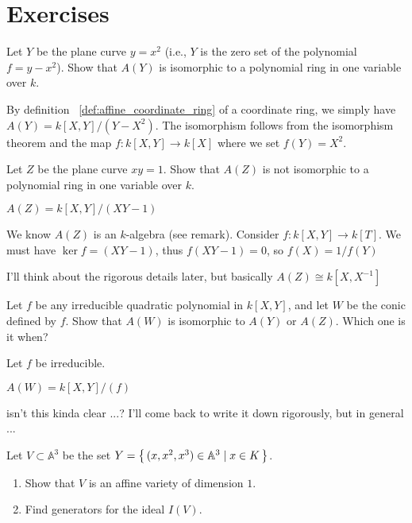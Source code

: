 \newpage
\section{Exercises}
%
%
\begin{exercise}[1.1. (a)]
    Let \( Y \) be the plane curve \( y = x^2 \) (i.e., \( Y \) is the zero set of the polynomial \( f = y - x^2 \)). Show that \( A(Y) \) is isomorphic to a polynomial ring in one variable over \( k \).
\end{exercise}
\begin{solution}
    By definition ~\ref{def:affine_coordinate_ring} of a coordinate ring, we simply have \(A(Y) = k[X, Y] / (Y - X^2)\). The isomorphism follows from the isomorphism theorem and the map \(f: k[X, Y] \rightarrow k[X]\) where we set \(f(Y) = X^2\).
\end{solution}
\begin{exercise}[1.1. (b)]
    Let \(Z\) be the plane curve \(xy = 1\). Show that \(A(Z)\) is not isomorphic to a polynomial ring in one variable over \(k\). 
\end{exercise}
\begin{solution}
    \(A(Z) = k[X, Y] / (XY - 1)\)

    We know \(A(Z)\) is an \(k\)-algebra (see remark). Consider \(f: k[X, Y] \longrightarrow k[T]\). We must have \(\ker{f} = (XY - 1)\), thus \(f(XY - 1) = 0\), so \(f(X) = 1 / f(Y)\)

    I'll think about the rigorous details later, but basically \(A(Z) \cong k[X, X^{-1}]\)
\end{solution}
\begin{exercise}[1.1. (c)]
    Let \(f\) be any irreducible quadratic polynomial in \(k[X, Y]\), and let \(W\) be the conic defined by \(f\). Show that \(A(W)\) is isomorphic to \(A(Y)\) or \(A(Z)\). Which one is it when?
\end{exercise}
\begin{solution}
    Let \(f\) be irreducible.

    \(A(W) = k[X, Y] / (f)\)
    
    isn't this kinda clear ...? I'll come back to write it down rigorously, but in general ...
\end{solution}
%
%
\begin{exercise}
    Let \(V \subset \mathbb{A}^3\) be the set \(Y = \left\{\, (x, x^2, x^3) \in \mathbb{A}^3 \mathrel{\mid} x \in K \,\right\}\).
    \begin{enumerate}
        \item Show that \(V\) is an affine variety of dimension \(1\).
        \item Find generators for the ideal \(I(V)\).
    \end{enumerate}
\end{exercise}
